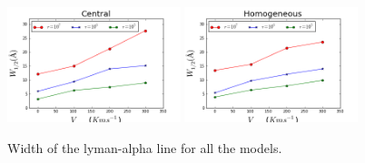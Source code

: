 \documentclass[usenatbib]{mn2e}
\begin{document}
\begin{figure}
    \includegraphics[width=0.45\textwidth]{WidthCentral.png}
    \includegraphics[width=0.45\textwidth]{WidthHomogeneous.png}
   \caption{Width of the lyman-alpha line for all the models.   \label{fig:widthvsvelocity}}
\end{figure}
\end{document}
